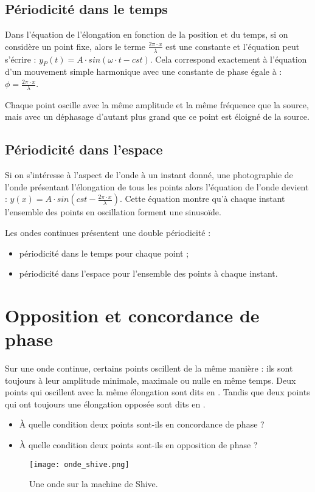 \subsection{Périodicité dans le temps}
Dans l'équation de l'élongation en fonction de la position et du temps, si on considère un point fixe, alors le terme \(\frac{2 \pi \cdot x}{\lambda}\) est une constante et l'équation peut s'écrire : \(y_P (t) = A \cdot sin (\omega \cdot t- cst)\). Cela correspond exactement à l'équation d'un mouvement simple harmonique avec une constante de phase égale à : \(\phi = \frac{2 \pi \cdot x}{\lambda}\).

\begin{encadre}
    Chaque point oscille avec la même amplitude et la même fréquence que la source, mais avec un déphasage d'autant plus grand que ce point est éloigné de la source.
\end{encadre}

\subsection{Périodicité dans l'espace}
Si on s'intéresse à l'aspect de l'onde à un instant donné, une photographie de l'onde présentant l'élongation de tous les points alors l'équation de l'onde devient : \(y (x) = A \cdot sin (cst - \frac{2 \pi  \cdot x}{\lambda})\). Cette équation montre qu'à chaque instant l'ensemble des points en oscillation forment une sinusoïde.

\begin{encadre}
    Les ondes continues présentent une double périodicité :
    \begin{itemize}
        \item périodicité dans le temps pour chaque point ;
        \item périodicité dans l'espace pour l'ensemble des points à chaque instant.
    \end{itemize}
\end{encadre}

\newpage

\section{Opposition et concordance de phase}
Sur une onde continue, certains points oscillent de la même manière : ils sont toujours à leur amplitude minimale, maximale ou nulle en même temps. Deux points qui oscillent avec la même élongation sont dits en . Tandis que deux points qui ont toujours une élongation opposée sont dits en .
\begin{itemize}[label=\textbullet]
    \item À quelle condition deux points sont-ils en concordance de phase ?
    \item À quelle condition deux points sont-ils en opposition de phase ?
\end{itemize}

\begin{figure}[h!]
    \centering
    \texttt{[image: onde\_shive.png]}
    \caption{Une onde sur la machine de Shive.}
    \label{onde_shive}
\end{figure}
